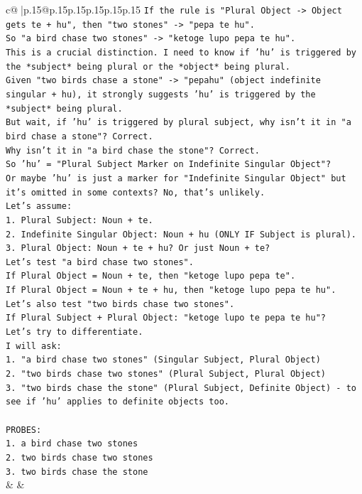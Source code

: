 \documentclass{article}
\begin{document}
{\begin{supertabular}{c@{$\;$}|p{.15\linewidth}@{}p{.15\linewidth}p{.15\linewidth}p{.15\linewidth}p{.15\linewidth}p{.15\linewidth}}
{{{\texttt{If the rule is "Plural Object {-}> Object gets te + hu", then "two stones" {-}> "pepa te hu".} \\
\texttt{So "a bird chase two stones" {-}> "ketoge lupo pepa te hu".} \\
\texttt{This is a crucial distinction. I need to know if 'hu' is triggered by the *subject* being plural or the *object* being plural.} \\
\texttt{Given "two birds chase a stone" {-}> "pepahu" (object indefinite singular + hu), it strongly suggests 'hu' is triggered by the *subject* being plural.} \\
\texttt{But wait, if 'hu' is triggered by plural subject, why isn't it in "a bird chase a stone"? Correct.} \\
\texttt{Why isn't it in "a bird chase the stone"? Correct.} \\
\texttt{So 'hu' = "Plural Subject Marker on Indefinite Singular Object"?} \\
\texttt{Or maybe 'hu' is just a marker for "Indefinite Singular Object" but it's omitted in some contexts? No, that's unlikely.} \\
\texttt{Let's assume:} \\
\texttt{1. Plural Subject: Noun + te.} \\
\texttt{2. Indefinite Singular Object: Noun + hu (ONLY IF Subject is plural).} \\
\texttt{3. Plural Object: Noun + te + hu? Or just Noun + te?} \\
\texttt{Let's test "a bird chase two stones".} \\
\texttt{If Plural Object = Noun + te, then "ketoge lupo pepa te".} \\
\texttt{If Plural Object = Noun + te + hu, then "ketoge lupo pepa te hu".} \\
\texttt{Let's also test "two birds chase two stones".} \\
\texttt{If Plural Subject + Plural Object: "ketoge lupo te pepa te hu"?} \\
\texttt{Let's try to differentiate.} \\
\texttt{I will ask:} \\
\texttt{1. "a bird chase two stones" (Singular Subject, Plural Object)} \\
\texttt{2. "two birds chase two stones" (Plural Subject, Plural Object)} \\
\texttt{3. "two birds chase the stone" (Plural Subject, Definite Object) {-} to see if 'hu' applies to definite objects too.} \\
\\ 
\texttt{PROBES:} \\
\texttt{1. a bird chase two stones} \\
\texttt{2. two birds chase two stones} \\
\texttt{3. two birds chase the stone} \\
            }
        }
    }
    & & \\ \\


\end{supertabular}}
\end{document}
